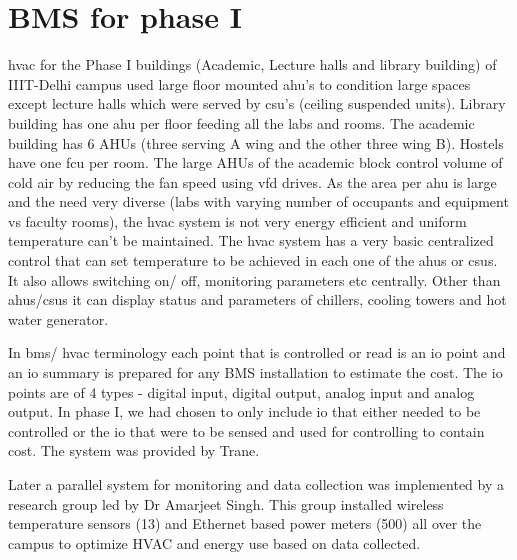 \documentclass[letterpaper,11pt]{report}
\begin{document}
\section{BMS for phase I}
\ac{hvac} for the Phase I buildings (Academic, Lecture halls and library building) of IIIT-Delhi campus used large floor mounted \ac{ahu}'s to condition large spaces except lecture halls which were served by \ac{csu}'s (ceiling suspended units). Library building has one \ac{ahu} per floor feeding all the labs and rooms. The academic building has 6 AHUs (three serving A wing and the other three wing B). Hostels have one \ac{fcu} per room. The large AHUs of the academic block control volume of cold air by reducing the fan speed using \ac{vfd} drives. As the area per \ac{ahu} is large and the need very diverse (labs with varying number of occupants and equipment vs faculty rooms), the \ac{hvac} system is not very energy efficient and uniform temperature can't be maintained. The \ac{hvac} system has a very basic centralized control that can set temperature to be achieved in each one of the \ac{ahu}s or \ac{csu}s. It also allows switching on/ off, monitoring parameters etc centrally. Other than \ac{ahu}s/\ac{csu}s it can display status and parameters of chillers, cooling towers and hot water generator.
\par
In \ac{bms}/ \ac{hvac} terminology each point that is controlled or read is an \ac{io} point and an \ac{io} summary is prepared for any BMS installation to estimate the cost. The \ac{io} points are of 4 types - digital input, digital output, analog input and analog output. In phase I, we had chosen to only include \ac{io} that either needed to be controlled or the \ac{io} that were to be sensed and used for controlling to contain cost. The system was provided by Trane.
\par
Later a parallel system for monitoring and data collection was implemented by a research group led by Dr Amarjeet Singh. This group installed wireless temperature sensors (13) and Ethernet based power meters (500) all over the campus to optimize HVAC and energy use based on data collected.
\pagebreak
\end{document}

